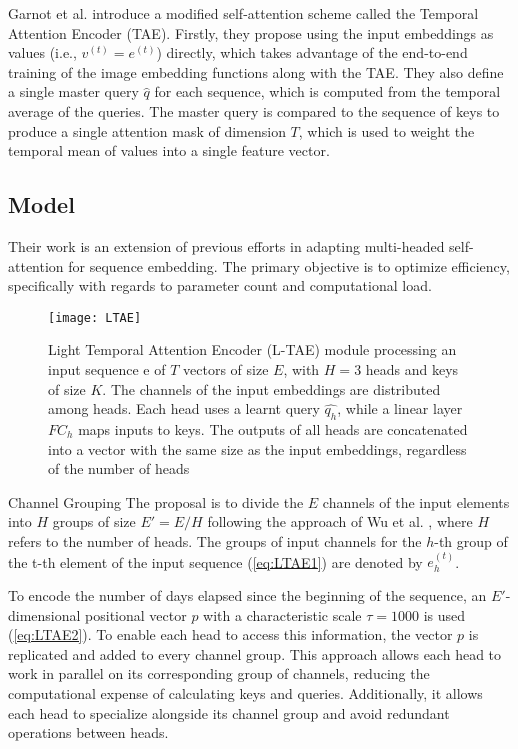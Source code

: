 Garnot et al. \cite{garnot2020satellite} introduce a modified self-attention scheme called the Temporal Attention Encoder (TAE).
Firstly, they propose using the input embeddings as values (i.e., $v^{(t)} = e^{(t)}$) directly, which takes advantage of the end-to-end training of the image embedding functions along with the TAE.
They also define a single master query $\hat{q}$ for each sequence, which is computed from the temporal average of the queries.
The master query is compared to the sequence of keys to produce a single attention mask of dimension $T$, which is used to weight the temporal mean of values into a single feature vector.



\subsection{Model}
Their work is an extension of previous efforts in adapting multi-headed self-attention for sequence embedding.
The primary objective is to optimize efficiency, specifically with regards to parameter count and computational load.

\begin{figure}[H]
  \centering
  \texttt{[image: LTAE]}
  \caption{Light Temporal Attention Encoder  (L-TAE) module processing an input sequence e of $T$ vectors of
  size $E$, with $H = 3$ heads and keys of size $K$. The channels of the input embeddings
  are distributed among heads. Each head uses a learnt query $\hat{q_h}$, while a linear layer
  $FC_h$ maps inputs to keys. The outputs of all heads are concatenated into a vector with
  the same size as the input embeddings, regardless of the number of heads \cite{LTAE}}
  \label{fig:LTAErchitecture}
\end{figure}

\begin{paragraph}{Channel Grouping} 
The proposal is to divide the $E$ channels of the input elements into $H$ groups of size $E' = E/H$ following the approach of Wu et al. \cite{wu2018group}, where $H$ refers to the number of heads. The groups of input channels for the $h$-th group of the t-th element of the input sequence (\ref{eq:LTAE1}) are denoted by $e^{(t)}_h$.

To encode the number of days elapsed since the beginning of the sequence, an $E'$-dimensional positional vector $p$ with a characteristic scale $\tau = 1000$ is used (\ref{eq:LTAE2}).
To enable each head to access this information, the vector $p$ is replicated and added to every channel group.
This approach allows each head to work in parallel on its corresponding group of channels, reducing the computational expense of calculating keys and queries. Additionally, it allows each head to specialize alongside its channel group and avoid redundant operations between heads.
\end{paragraph} 

